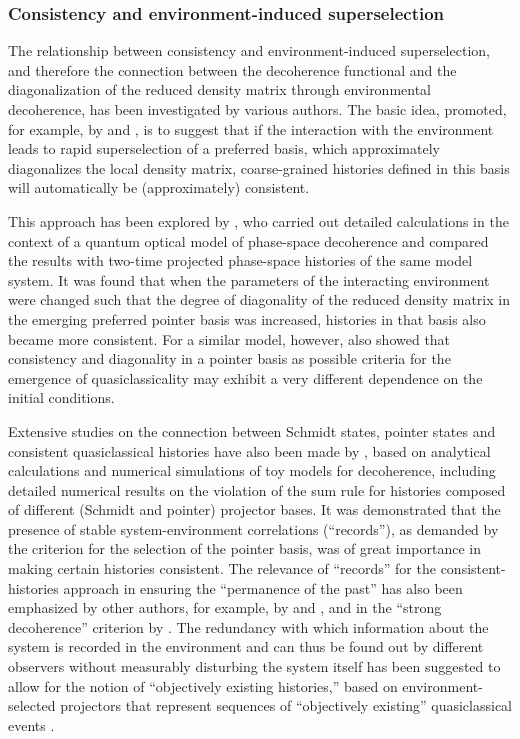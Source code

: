 \documentclass[twocolumn,rmp,aps,amsmath,amsfonts,noshowkeys,noshowpacs]{revtex4}
\begin{document}
\subsubsection{Consistency and environment-induced superselection}

The relationship between consistency and environment-induced
superselection, and therefore the connection between the decoherence
functional and the diagonalization of the reduced density matrix
through environmental decoherence, has been investigated by various
authors. The basic idea, promoted, for example, by
\citet{Zurek:1993:pu} and \citet{Paz:1993:ww}, is to suggest
that if the interaction with the environment leads to rapid
superselection of a preferred basis, which approximately diagonalizes
the local density matrix, coarse-grained histories defined in this
basis will automatically be (approximately) consistent.

This approach has been explored by \citet{Twamley:1993:bz}, who
carried out detailed calculations in the context of a quantum optical
model of phase-space decoherence and compared the results with
two-time projected phase-space histories of the same model system. It
was found that when the parameters of the interacting environment were
changed such that the degree of diagonality of the reduced density
matrix in the emerging preferred pointer basis was increased,
histories in that basis also became more consistent. For a similar
model, however, \citet{Twamley:1993:cg} also showed that consistency
and diagonality in a pointer basis as possible criteria for the
emergence of quasiclassicality may exhibit a very different dependence
on the initial conditions.

Extensive studies on the connection between Schmidt states, pointer
states and consistent quasiclassical histories have also been made by
\citet{Albrecht:1992:rz,Albrecht:1993:pq}, based on analytical
calculations and numerical simulations of toy models for decoherence,
including detailed numerical results on the violation of the sum rule
for histories composed of different (Schmidt and pointer) projector
bases. It was demonstrated that the presence of stable
system-environment correlations (``records''), as demanded by the
criterion for the selection of the pointer basis, was of great
importance in making certain histories consistent. The relevance of
``records'' for the consistent-histories approach in ensuring the
``permanence of the past'' has also been emphasized by other authors,
for example, by \citet{Paz:1993:ww} and
\citet{Zurek:1993:pu,Zurek:2002:ii}, and in the ``strong decoherence''
criterion by \citet{GellMann:1998:xy}.  The redundancy with which
information about the system is recorded in the environment and can
thus be found out by different observers without measurably disturbing
the system itself has been suggested to allow for the notion of
``objectively existing histories,'' based on environment-selected
projectors that represent sequences of ``objectively existing''
quasiclassical events
\citep{Zurek:1993:pu,Paz:1993:ww,Zurek:2002:ii,Zurek:2003:pl}.
\end{document}
